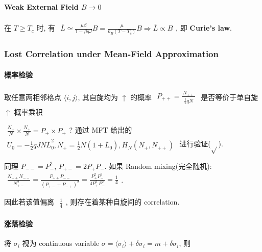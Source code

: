 \documentclass[../../main.tex]{subfiles}
\begin{document}
\paragraph{Weak External Field $B\rightarrow 0$}

在 $T\geq T_{c}$ 时, 有 $\begin{aligned}
    \overline{L}\simeq \frac{\mu\beta}{1-\beta qJ}B = \frac{\mu}{k_{B}(T-T_{c})}B\Rightarrow \overline{L}\propto B
\end{aligned}$, 即 \textbf{Curie's law}. 

\subsubsection{Lost Correlation under Mean-Field Approximation}

\paragraph{概率检验} 取任意两相邻格点 $\langle i,j\rangle$, 其自旋均为 $\uparrow$ 的概率 $\begin{aligned}
    P_{++} = \frac{N_{++}}{\begin{aligned}
        \frac{1}{2}qN
    \end{aligned}}
\end{aligned}$ 是否等价于单自旋 $\uparrow$ 概率乘积

$\begin{aligned}
    \frac{N_{+}}{N}\times\frac{N_{+}}{N} = P_{+}\times P_{+}
\end{aligned}$? 通过 MFT 给出的 $\begin{aligned}
    U_{0} = -\frac{1}{2}qJN\overline{L}_{0}^{2}, N_{+} = \frac{1}{2}N(1+\overline{L}_{0}), H_{N}(N_{+},N_{++})
\end{aligned}$ 进行验证($\sqrt{}$). 

同理 $P_{--}=P_{-}^{2}$, $P_{+-}=2P_{+}P_{-}$. 如果 Random mixing(完全随机): $\begin{aligned}
    \frac{N_{++}N_{--}}{N_{+-}^{2}} = \frac{P_{++}P_{--}}{(P_{+-}+P_{-+})^{2}} = \frac{P_{+}^{2}P_{-}^{2}}{4P_{+}^{2}P_{-}^{2}} = \frac{1}{4}
\end{aligned}$. 

因此若该值偏离 $\begin{aligned}
    \frac{1}{4}
\end{aligned}$, 则存在着某种自旋间的 correlation.

\paragraph{涨落检验} 将 $\sigma_{i}$ 视为 continuous variable $\sigma = \langle\sigma_{i}\rangle + \delta\sigma_{i} = m+\delta\sigma_{i}$, 则
\end{document}
